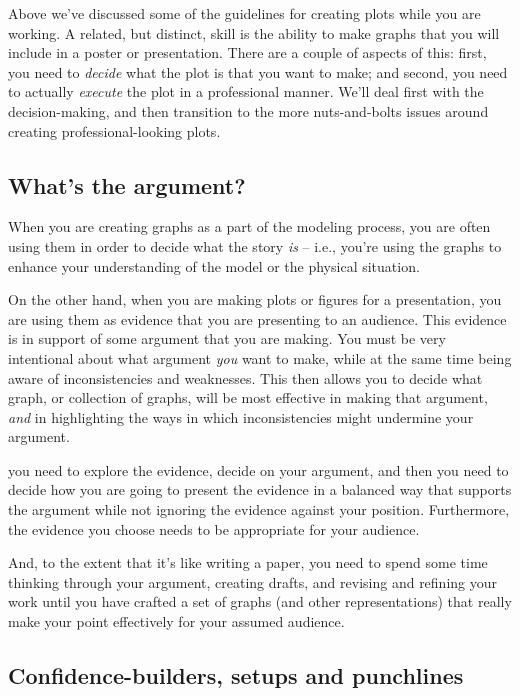Above we've discussed some of the guidelines for creating plots while you are working.  A related, but distinct, skill is the ability to make graphs that you will include in a poster or presentation.  There are a couple of aspects of this:  first, you need to {\it decide} what the plot is that you want to make; and second, you need to actually {\it execute} the plot in a professional manner.  We'll deal first with the decision-making, and then transition to the more nuts-and-bolts issues around creating professional-looking plots.


\subsection{What's the argument?}

When you are creating graphs as a part of the modeling process, you are often using them in order to decide what the story {\it is} -- i.e., you're using the graphs to enhance your understanding of the model or the physical situation.

On the other hand, when you are making plots or figures for a presentation, you are using them as evidence that you are presenting to an audience.  This evidence is in support of some argument that you are making.  You must be very intentional about what argument {\it you} want to make, while at the same time being aware of inconsistencies and weaknesses.  This then allows you to decide what graph, or collection of graphs, will be most effective in making that argument, {\it and} in highlighting the ways in which inconsistencies might undermine your argument.

  you need to explore the evidence, decide on your argument, and then you need to decide how you are going to present the evidence in a balanced way that supports the argument while not ignoring the evidence against your position.  Furthermore, the evidence you choose needs to be appropriate for your audience.

And, to the extent that it's like writing a paper, you need to spend some time thinking through your argument, creating drafts, and revising and refining your work until you have crafted a set of graphs (and other representations) that really make your point effectively for your assumed audience.  

\subsection{Confidence-builders, setups and punchlines}

